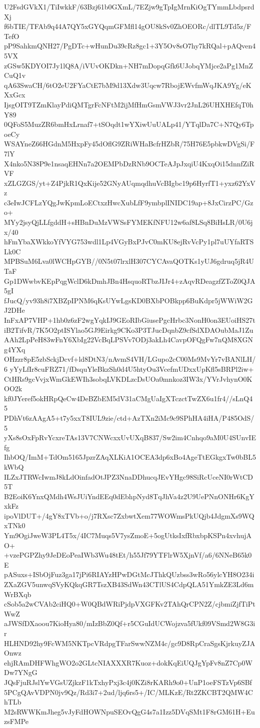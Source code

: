 U2FsdGVkX1/TiIwkkF/63Bzj61b0GXmL/7EZjw9gTpIgMrnKiOgTYmmLbdpsrdXj
f6bTIE/TFAb9q44A7QY5xGYQqmGFMfl14gOU8kSv0ZhOEORc/dlTL9Td5z/FTefO
pP9SahkmQNH27/PgDTc+wHunDu39cRz8gc1+3Y5Ov8sO7hy7kRQal+pAQven45VX
zGSw5KDYOI7Jy1lQ8A/iVUvOKDkn+NH7mDopqGfk6UJobqYMjce2aPg1MnZCuQ1v
qA63SwaCH/6tO2eU2FYaCtE7bM9d13Xdw3Uqcw7RbojEWvfmWqJKA9Yg/eKXxGcx
IjsgOIT9TZmKlayPdiQMTgrFcNFtM2ijMfHmGsmVWJ3vr2JnL26UHXHEfqT0hY89
0QFoS5MuzZR6bmHxLrnaf7+tSOqdt1wYXiwUuUALp41/YTqlDa7C+N7Qy6TpoeCy
WSAYneZ66HGdnM5HxpFy45dOflG9ZRiWHaBcfrHZbR/75H76E5pbkwDVgSi/F7lY
X4nko5N38P9e1nsaqEHNn7a2OEMPbDzRNb9OCTeAJpJxqiU4KxqOi15dnnfZiRVF
xZLGZGS/yt+Z4PjkR1QxKije52GNyAUqmqdhuVcBIgbc19p6HyrfT1+yxz62YxVz
c3eIwJCFLzYQgJwKpmLoECtxzHwcXubLfF9ymbplINIDC19ap+8JxCirzPC/Gzo+
MYy2jsyQjLLfgddH+sHBnDuMzVWSsFYMEKfNFU12w6af8LSq8BiHsLR/0U6jx/40
hFmYbaXWkkoYfVYG753wdl1Lp4VGyBxPJvC0mKU8ejRvVcPy1pl7uUYfaRTSLk0C
MPBSuM6Lva0lWCHpGYB//0N5t07lrxlH307CYCAvaQOTKs1yUJ6gdruq5jR4UTaF
Gp1DWwbvKEpPqgWclD6kDmhJBn4HsquoRTbzJIJr4+zAqvRDeagzfZToZ0QJA5gI
fJucQ/yv93h8i7XBZpIPNM6qKsUYwLgsKD0BXbPOBkpp6BuKdpr5jWWiW2GJ2DHe
InFxAP7VHP+1hb0z6zF2wgYqkIJ9GEoRIbGiusePgcHrbc3NonH0on3EUoiHS27t
iB2TifvR/7K5O2ptISYlao5GJ9Eirkg9CKo3P3TJucDqnbZ9cfSdXDAOubMaJ1Zu
AAh2LpPeH83wFnY6XbIg22VcBqLPSVv7ODj3akLh4CavpOFQgFw7nQM8XGNg4YXq
OHzzr8pE5zbSckjDcvf+ld8DtN3/nAvmS4VH/LGupo2cC00Ms9MvYr7vBANlLH/6
yYyLfIr8cuFRZ71/fDsquYleBkzSh0d4U5htyOu3VcefmUDxxUpKfl5sBRPl2iw+
CtHRs9gcVvjxWmGkEWIh3sobqLVKDLzcDsUOa0mnkoz3IW3x/YVrJvhynO0KOO2k
kf0JYeref5okHRpQeCw4DeBZbEM5dV31aCMgUaIgXTczctTwZX6u1fr4//sLnQ45
PDhVt6zAAgA5+t7y5xxT8IUL9zie/ctd+AzTXn2iMc9c9SPhHA4iHA/P485OdS/5
yXs8sOxFpRvYcxreTAs13V7CNWcxxUvUXqB837/Sw2im4Cnhqo9aM0U4SUnvIEfg
IhbOQ/ImM+TdOm5165JpzrZAqXLKiA1OCEA3dp6xBo4AgeTtEGkgxTw0bBL5kWbQ
ILZxJTRWcIwmJ8kLdOinfadOtJPZ3NnaDDhucqJEvYHgc98SiRcUceNI0rWtCD5T
B2EoiK6YnxQMdh4WsJUiYndEEq0dEbhpNyd8TqJhVa4z2U9UePNnONHr6KgYxkFz
ipoVlDUT+/4gY8xTVb+o/j7RXsc7ZxbwtXem77WOWmsPkUQjb4JdgmXs9WQxTNk0
Ym9OgiJweW3PL4T5x/4IC7Muqs5V7ysZmoE+5ogUtksIxfRbxbpKSPn4xvhujAO+
+vzePGPZhy9JeDEoPeaIWb3Wu48tEt/h55Jf79YTFlrW5XjnVf/a6/6NNeB65k0E
pASuxs+ISbOjFuz3ga17jPi6RIAYzHPwDGtMcJThkQUzbss3wRo56ylcYH8O234i
ZXaZGV5unwqSVyKQkqGR7TszXB43SdWn43CTlUS4CdpQLA51YmkZE3Ld6mWrBXqb
cSob5a2wCVAb2ciHQ0+W0QBdWRiPjdpVXGFKv2TAhQrCPN2Z/cjbmiZjfTiPtWwZ
aJWSfDXaoou7KioHya80/mIzBbZ0Qf+r5CGuIdUCWojzva5fUkf09VSmd2W8G3ir
HLHND92hy9FcWM5NKTpcVRdpgTFarSwwNZM4c/gc9D8RpCraSgsKjrkuyZJAOnwz
ehjRAmDHFWhgWO2o2GLtcNIAXXXR7Kuoz+dokKqEiUQJgYpFv8nZ7Cp0WDw7YNgG
JQsFjuRJslYwVGsUZjkzF1kTxhyPxj3c4j0KZi8rKARh9o0+UnP1oeFSTzVp6SBf
5PCgQAvVDPN0jv9Qz/Rd3i7+2ud/ljq6rs5+/IC/MLKzE/Rt2ZKCBT2QMW4ChTLb
M2sRWWKmJheg5vJyFdHOWNpuSEOvQgG4s7a1Izz5DVqSMt1F8rGM61H+EuzsFMPe
